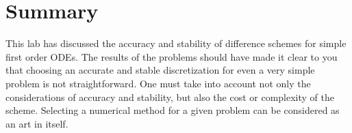 % 
%
%
%
%
%

\section{Summary}
\label{lab2:sec:summary}

This lab has discussed the accuracy and stability of difference
schemes for simple first order ODEs.  
The results of the problems should have made it clear to you that
choosing an accurate and stable discretization for even a very simple
problem is not straightforward.  
One must take into account not only the considerations of accuracy and
stability, but also the cost or complexity of the scheme.
Selecting a numerical method for a
given problem can be considered as an art in itself.


